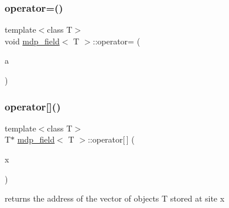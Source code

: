 \mbox{\label{classmdp__field_a24364bce6444668661a0688632af87ec}} 
\subsubsection{\texorpdfstring{operator=()}{operator=()}\hspace{0.1cm}{\footnotesize\ttfamily [2/2]}}
{\footnotesize\ttfamily template$<$class T$>$ \\
void \hyperlink{classmdp__field}{mdp\+\_\+field}$<$ T $>$\+::operator= (\begin{DoxyParamCaption}\item[{const T}]{a }\end{DoxyParamCaption})\hspace{0.3cm}{\ttfamily [inline]}}

\mbox{\label{classmdp__field_a7dab126ffc90476401048cdf747077ef}} 
\subsubsection{\texorpdfstring{operator[]()}{operator[]()}\hspace{0.1cm}{\footnotesize\ttfamily [1/2]}}
{\footnotesize\ttfamily template$<$class T$>$ \\
T$\ast$ \hyperlink{classmdp__field}{mdp\+\_\+field}$<$ T $>$\+::operator\mbox{[}$\,$\mbox{]} (\begin{DoxyParamCaption}\item[{\hyperlink{classmdp__site}{mdp\+\_\+site}}]{x }\end{DoxyParamCaption})\hspace{0.3cm}{\ttfamily [inline]}}



returns the address of the vector of objects T stored at site x 

\mbox{\label{classmdp__field_a97c56a74600b0d408ec24a161c4e8643}} 
